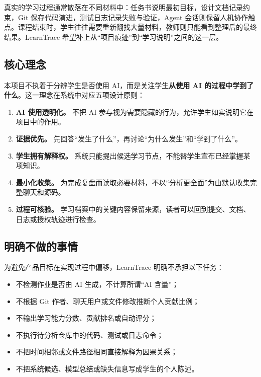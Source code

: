 \documentclass[UTF8,a4paper,12pt]{ctexart}
\begin{document}
真实的学习过程通常散落在不同材料中：任务书说明最初目标，设计文档记录约束，Git 保存代码演进，测试日志记录失败与验证，Agent 会话则保留人机协作触点。课程结束时，学生往往需要重新翻找大量材料，教师则只能看到整理后的最终结果。LearnTrace 希望补上从“项目痕迹”到“学习说明”之间的这一层。

\subsection{核心理念}

本项目不执着于分辨学生是否使用 AI，而是关注学生\textbf{从使用 AI 的过程中学到了什么}。这一理念在系统中对应五项设计原则：

\begin{enumerate}
  \item \textbf{AI 使用透明化。} 不把 AI 参与视为需要隐藏的行为，允许学生如实说明它在项目中的作用。
  \item \textbf{证据优先。} 先回答“发生了什么”，再讨论“为什么发生”和“学到了什么”。
  \item \textbf{学生拥有解释权。} 系统只能提出候选学习节点，不能替学生宣布已经掌握某项知识。
  \item \textbf{最小化收集。} 为完成复盘而读取必要材料，不以“分析更全面”为由默认收集完整聊天和源码。
  \item \textbf{过程可核验。} 学习档案中的关键内容保留来源，读者可以回到提交、文档、日志或授权轨迹进行检查。
\end{enumerate}

\subsection{明确不做的事情}

为避免产品目标在实现过程中偏移，LearnTrace 明确不承担以下任务：

\begin{itemize}
  \item 不检测作业是否由 AI 生成，不计算所谓“AI 含量”；
  \item 不根据 Git 作者、聊天用户或文件修改推断个人贡献比例；
  \item 不输出学习能力分数、贡献排名或自动评分；
  \item 不执行待分析仓库中的代码、测试或日志命令；
  \item 不把时间相邻或文件路径相同直接解释为因果关系；
  \item 不把系统候选、模型总结或缺失信息写成学生的个人陈述。
\end{itemize}
\end{document}
